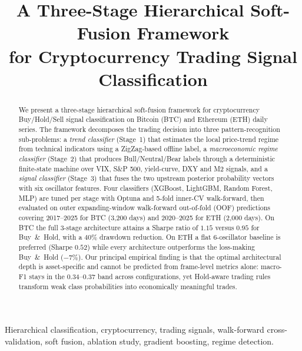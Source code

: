 \documentclass[conference]{IEEEtran}
\begin{document}
\title{A Three-Stage Hierarchical Soft-Fusion Framework\\
for Cryptocurrency Trading Signal Classification}

\author{
}

\maketitle

\begin{abstract}
We present a three-stage hierarchical soft-fusion framework for cryptocurrency Buy/Hold/Sell signal classification on Bitcoin (BTC) and Ethereum (ETH) daily series. The framework decomposes the trading decision into three pattern-recognition sub-problems: a \emph{trend classifier} (Stage~1) that estimates the local price-trend regime from technical indicators using a ZigZag-based offline label, a \emph{macroeconomic regime classifier} (Stage~2) that produces Bull/Neutral/Bear labels through a deterministic finite-state machine over VIX, S\&P 500, yield-curve, DXY and M2 signals, and a \emph{signal classifier} (Stage~3) that fuses the two upstream posterior probability vectors with six oscillator features. Four classifiers (XGBoost, LightGBM, Random Forest, MLP) are tuned per stage with Optuna and 5-fold inner-CV walk-forward, then evaluated on outer expanding-window walk-forward out-of-fold (OOF) predictions covering 2017--2025 for BTC (3{,}200 days) and 2020--2025 for ETH (2{,}000 days). On BTC the full 3-stage architecture attains a Sharpe ratio of $1.15$ versus $0.95$ for Buy~\&~Hold, with a $40\%$ drawdown reduction. On ETH a flat 6-oscillator baseline is preferred (Sharpe $0.52$) while every architecture outperforms the loss-making Buy~\&~Hold ($-7\%$). Our principal empirical finding is that the optimal architectural depth is asset-specific and cannot be predicted from frame-level metrics alone: macro-F1 stays in the 0.34--0.37 band across configurations, yet Hold-aware trading rules transform weak class probabilities into economically meaningful trades.
\end{abstract}

\begin{IEEEkeywords}
Hierarchical classification, cryptocurrency, trading signals, walk-forward cross-validation, soft fusion, ablation study, gradient boosting, regime detection.
\end{IEEEkeywords}
\end{document}

